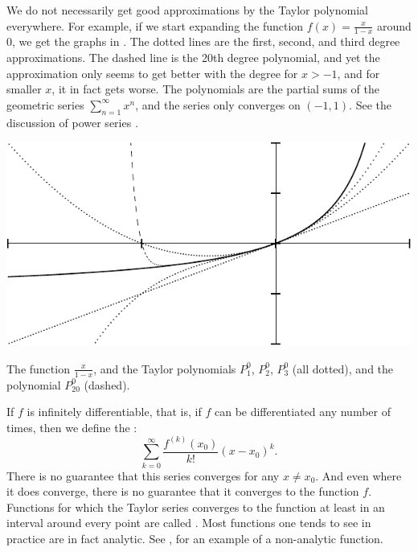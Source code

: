 We do not necessarily get good approximations
by the Taylor polynomial everywhere.
For example, if we start expanding the function $f(x) =
\frac{x}{1-x}$ around 0, we get the graphs in
.  The dotted lines are the first, second, and
third degree approximations.  The dashed line is
the 20th degree polynomial, and yet the approximation only seems to get
better with the degree for $x > -1$, and for smaller $x$, it in fact gets worse.
The polynomials
are the partial sums of the geometric series $\sum_{n=1}^\infty x^n$,
and the series only converges on $(-1,1)$.
See the discussion of power series
.

\begin{myfigureht}
\includegraphics{figures/taylorgeom}
\caption{The function $\frac{x}{1-x}$, and the Taylor polynomials
$P_1^0$, $P_2^0$, $P_3^0$ (all dotted), and the polynomial $P_{20}^0$
(dashed).\label{fig:taylorgeom}}
\end{myfigureht}

If $f$ is infinitely differentiable, that is, if $f$ can be
differentiated any number of times, then 
we define the \emph{}:
\begin{equation*}
\sum_{k=0}^\infty
\frac{f^{(k)}(x_0)}{k!}{(x-x_0)}^k .
\end{equation*}
There is no guarantee that this series converges for any
$x \not= x_0$.  And even where it does converge, there is no guarantee
that it converges to the function $f$.  Functions for which
the Taylor series converges to the function at least in an interval
around every point are called
\emph{}.
Most functions one tends to see in practice are in fact analytic.
See , for an example of a non-analytic
function.

\medskip

